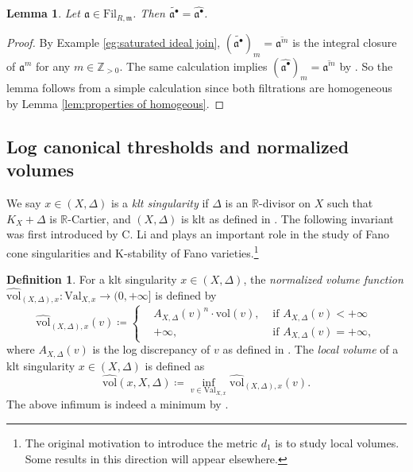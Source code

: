 \documentclass[11pt, leqno]{amsart}%
\theoremstyle{plain}
\newtheorem{lemma}[theorem]{Lemma}
\theoremstyle{definition}
\newtheorem{definition}[theorem]{Definition}
\theoremstyle{remark}
\newcommand{\bR}{\mathbb{R}}
\newcommand{\bZ}{\mathbb{Z}}
\newcommand{\fa}{\mathfrak{a}}
\newcommand{\fm}{\mathfrak{m}}
\newcommand{\vol}{\mathrm{vol}}
\newcommand{\Val}{\mathrm{Val}}
\newcommand{\nvol}{\widehat{\mathrm{vol}}}
\newcommand{\R}{\mathbb{R}}
\newcommand{\Fil}{\mathrm{Fil}}
\numberwithin{equation}{section}
\begin{document}
\begin{lemma}\label{lem:homogenization and saturation for adic}
    Let $\fa\in\Fil_{R,\fm}$. Then $\widetilde{\fa^\bullet}=\widehat{\fa^\bullet}$. 
\end{lemma}

\begin{proof}
    By Example \ref{eg:saturated ideal join}, $(\widetilde{\fa^\bullet})_m=\overline{\fa^m}$ is the integral closure of $\fa^m$ for any $m\in\bZ_{>0}$. The same calculation implies $(\widehat{\fa^\bullet})_m=\overline{\fa^m}$ by \cite[Proposition 6.10]{HS06}. So the lemma follows from a simple calculation since both filtrations are homogeneous by Lemma \ref{lem:properties of homogeous}.
\end{proof}




\subsection{Log canonical thresholds and normalized volumes}\label{ss:nvol}\label{ssec:nvol}

We say $x\in(X,\Delta)$ is a \emph{klt singularity} if $\Delta$ is an $\bR$-divisor on $X$ such that $K_{X}+\Delta$ is $\R$-Cartier, and $(X,\Delta)$ is klt as defined in \cite{KM98}. The following invariant was first introduced by C. Li \cite{Li18} and  plays an important role in the study of Fano cone singularities and K-stability of Fano varieties.\footnote{The original motivation to introduce the metric $d_1$ is to study local volumes. Some results in this direction will appear elsewhere.}


\begin{definition}\label{def:nvol}
    For a klt singularity $x\in(X,\Delta)$, the \emph{normalized volume function} $\nvol_{(X,\Delta),x}:\Val_{X,x}\to (0,+\infty]$ is defined by
    \begin{equation*}
        \nvol_{(X,\Delta),x}(v)\coloneqq \left\{\begin{aligned}
        &A_{X,\Delta}(v)^n\cdot \vol(v), &\text{ if } A_{X,\Delta}(v)<+\infty\\
        &+\infty, &\text{ if } A_{X,\Delta}(v)=+\infty,
        \end{aligned}\right.
    \end{equation*}
    where $A_{X,\Delta}(v)$ is the log discrepancy of $v$ as defined in \cites{JM12,BdFFU15}. 
    The \emph{local volume} of a klt singularity $x\in(X,\Delta)$ is defined as
    \[
        \nvol(x,X,\Delta)\coloneqq \inf_{v\in\Val_{X,x}} \nvol_{(X,\Delta),x}(v).
    \]
    The above infimum is indeed a minimum by \cites{Blu18, Xu20}.
\end{definition}
\end{document}

